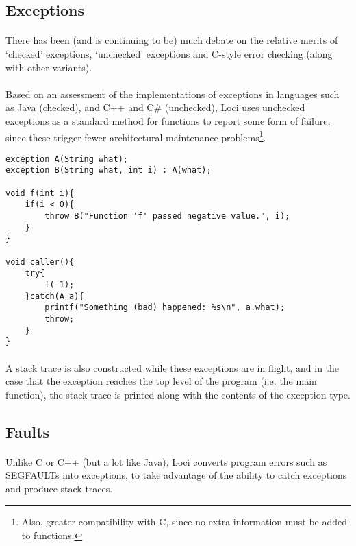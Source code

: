 \documentclass[12pt,twoside,notitlepage]{report}
\begin{document}
\subsection{Exceptions}

\paragraph{}
There has been (and is continuing to be) much debate on the relative merits of `checked' exceptions, `unchecked' exceptions and C-style error checking (along with other variants).

\paragraph{}
Based on an assessment of the implementations of exceptions in languages such as Java (checked), and C++ and C\# (unchecked), Loci uses unchecked exceptions as a standard method for functions to report some form of failure, since these trigger fewer architectural maintenance problems\footnote{Also, greater compatibility with C, since no extra information must be added to functions.}.

\small{
\begin{verbatim}
exception A(String what);
exception B(String what, int i) : A(what);

void f(int i){
    if(i < 0){
        throw B("Function 'f' passed negative value.", i);
    }
}

void caller(){
    try{
        f(-1);
    }catch(A a){
        printf("Something (bad) happened: %s\n", a.what);
        throw;
    }
}
\end{verbatim}
}

\paragraph{}
A stack trace is also constructed while these exceptions are in flight, and in the case that the exception reaches the top level of the program (i.e. the main function), the stack trace is printed along with the contents of the exception type.

\subsection{Faults}

\paragraph{}
Unlike C or C++ (but a lot like Java), Loci converts program errors such as SEGFAULTs into exceptions, to take advantage of the ability to catch exceptions and produce stack traces.
\end{document}

